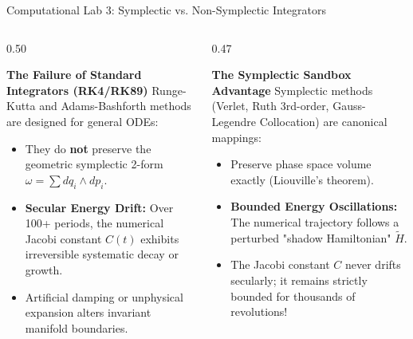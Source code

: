 \documentclass[aspectratio=169, 10pt]{beamer}
\begin{document}
\begin{frame}{Computational Lab 3: Symplectic vs. Non-Symplectic Integrators}
    \begin{columns}[t]
        \begin{column}{0.50\textwidth}
            \begin{alertblock}{\textbf{The Failure of Standard Integrators (RK4/RK89)}}
                \scriptsize
                Runge-Kutta and Adams-Bashforth methods are designed for general ODEs:
                \begin{itemize}\setlength{\itemsep}{1.5pt}
                    \item They do \textbf{not} preserve the geometric symplectic 2-form $\omega = \sum dq_i \wedge dp_i$.
                    \item \textbf{Secular Energy Drift:} Over 100+ periods, the numerical Jacobi constant $C(t)$ exhibits irreversible systematic decay or growth.
                    \item Artificial damping or unphysical expansion alters invariant manifold boundaries.
                \end{itemize}
            \end{alertblock}
        \end{column}
        
        \begin{column}{0.47\textwidth}
            \begin{block}{\textbf{The Symplectic Sandbox Advantage}}
                \scriptsize
                Symplectic methods (Verlet, Ruth 3rd-order, Gauss-Legendre Collocation) are canonical mappings:
                \begin{itemize}\setlength{\itemsep}{1.5pt}
                    \item Preserve phase space volume exactly (Liouville's theorem).
                    \item \textbf{Bounded Energy Oscillations:} The numerical trajectory follows a perturbed "shadow Hamiltonian" $\tilde{H}$.
                    \item The Jacobi constant $C$ never drifts secularly; it remains strictly bounded for thousands of revolutions!
                \end{itemize}
            \end{block}
        \end{column}
    \end{columns}
\end{frame}
\end{document}

